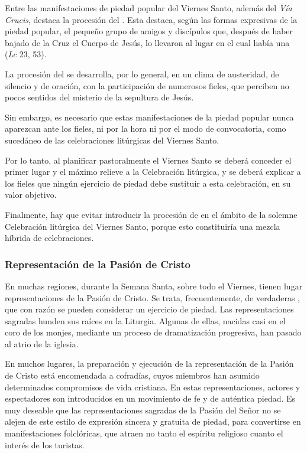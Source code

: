 \begin{introstyle}
Entre las manifestaciones de piedad popular del Viernes Santo, además del \textit{Vía Crucis}, destaca la procesión del . Esta destaca, según las formas expresivas de la piedad popular, el pequeño grupo de amigos y discípulos que, después de haber bajado de la Cruz el Cuerpo de Jesús, lo llevaron al lugar en el cual había una  (\textit{Lc} 23, 53).

La procesión del  se desarrolla, por lo general, en un clima de austeridad, de silencio y de oración, con la participación de numerosos fieles, que perciben no pocos sentidos del misterio de la sepultura de Jesús.

Sin embargo, es necesario que estas manifestaciones de la piedad popular nunca aparezcan ante los fieles, ni por la hora ni por el modo de convocatoria, como sucedáneo de las celebraciones litúrgicas del Viernes Santo.

Por lo tanto, al planificar pastoralmente el Viernes Santo se deberá conceder el primer lugar y el máximo relieve a la Celebración litúrgica, y se deberá explicar a los fieles que ningún ejercicio de piedad debe sustituir a esta celebración, en su valor objetivo.

Finalmente, hay que evitar introducir la procesión de  en el ámbito de la solemne Celebración litúrgica del Viernes Santo, porque esto constituiría una mezcla híbrida de celebraciones.

\subsubsection{Representación de la Pasión de Cristo}

En muchas regiones, durante la Semana Santa, sobre todo el Viernes, tienen lugar representaciones de la Pasión de Cristo. Se trata, frecuentemente, de verdaderas , que con razón se pueden considerar un ejercicio de piedad. Las representaciones sagradas hunden sus raíces en la Liturgia. Algunas de ellas, nacidas casi en el coro de los monjes, mediante un proceso de dramatización progresiva, han pasado al atrio de la iglesia.

En muchos lugares, la preparación y ejecución de la representación de la Pasión de Cristo está encomendada a cofradías, cuyos miembros han asumido determinados compromisos de vida cristiana. En estas representaciones, actores y espectadores son introducidos en un movimiento de fe y de auténtica piedad. Es muy deseable que las representaciones sagradas de la Pasión del Señor no se alejen de este estilo de expresión sincera y gratuita de piedad, para convertirse en manifestaciones folclóricas, que atraen no tanto el espíritu religioso cuanto el interés de los turistas.


\end{introstyle}
